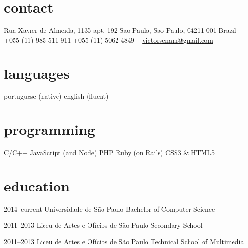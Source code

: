 \documentclass[]{friggeri-cv} %
\begin{document}


\begin{aside} %
\section{contact}
Rua Xavier de Almeida, 1135 apt. 192
São Paulo, São Paulo, 04211-001
Brazil
~
+055 (11) 985 511 911
+055 (11) 5062 4849
~
\href{mailto:victorsenam@gmail.com}{victorsenam@gmail.com}
\section{languages}
portuguese (native)
english (fluent)
\section{programming}
C/C++
JavaScript (and Node)
PHP
Ruby (on Rails)
CSS3 \& HTML5
\end{aside}


\section{education}

\begin{entrylist}


\entry
{2014--current}
{Universidade de São Paulo}
{Bachelor of Computer Science}

\entry
{2011--2013}
{Liceu de Artes e Ofícios de São Paulo}
{Secondary School}

\entry
{2011--2013}
{Liceu de Artes e Ofícios de São Paulo}
{Technical School of Multimedia}


\end{entrylist}
\end{document}
